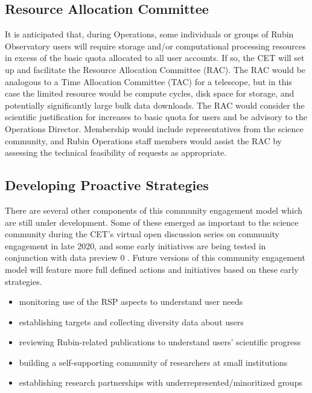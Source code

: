 \documentclass[DM,lsstdraft,toc]{lsstdoc}
\begin{document}
\subsection{Resource Allocation Committee}\label{ssec:mod_rac}

It is anticipated that, during Operations, some individuals or groups of Rubin Observatory users will require storage and/or computational processing resources in excess of the basic quota allocated to all user accounts.
If so, the CET will set up and facilitate the Resource Allocation Committee (RAC).
The RAC would be analogous to a Time Allocation Committee (TAC) for a telescope, but in this case the limited resource would be compute cycles, disk space for storage, and potentially significantly large bulk data downloads.
The RAC would consider the scientific justification for increases to basic quota for users and be advisory to the Operations Director.
Membership would include representatives from the science community, and Rubin Operations staff members would assist the RAC by assessing the technical feasibility of requests as appropriate.


\subsection{Developing Proactive Strategies}

There are several other components of this community engagement model which are still under development.
Some of these emerged as important to the science community during the CET's virtual open discussion series on community engagement in late 2020, and some early initiatives are being tested in conjunction with data preview 0 .
Future versions of this community engagement model will feature more full defined actions and initiatives based on these early strategies.
\begin{itemize}
\item monitoring use of the RSP aspects to understand user needs
\item establishing targets and collecting diversity data about users
\item reviewing Rubin-related publications to understand users' scientific progress
\item building a self-supporting community of researchers at small institutions
\item establishing research partnerships with underrepresented/minoritized groups
\end{itemize}
\end{document}
